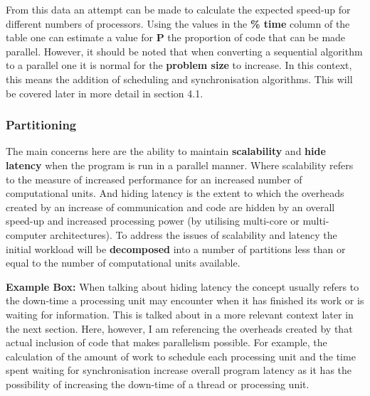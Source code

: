 \documentclass[11pt]{article} %
\begin{document}
From this data an attempt can be made to calculate the expected speed-up for different numbers of processors. Using the values in the {\bf \% time} column of the table one can estimate a value for {\bf P} the proportion of code that can be made parallel. However, it should be noted that when converting a sequential algorithm to a parallel one it is normal for the {\bf problem size} to increase. In this context, this means the addition of scheduling and synchronisation algorithms. This will be covered later in more detail in section 4.1.
\subsubsection*{Partitioning}
The main concerns here are the ability to maintain {\bf scalability} and {\bf hide latency} when the program is run in a parallel manner. Where scalability refers to the measure of increased performance for an increased number of computational units. And hiding latency is the extent to which the overheads created by an increase of communication and code are hidden by an overall speed-up and increased processing power (by utilising multi-core or multi-computer architectures). \cite[p78,79]{ref9} To address the issues of scalability and latency the initial workload will be {\bf decomposed} into a number of partitions less than or equal to the number of computational units available.\\
\begin{mdframed}
{\bf Example Box:} When talking about hiding latency the concept usually refers to the down-time a processing unit may encounter when it has finished its work or is waiting for information. This is talked about in a more relevant context later in the next section. Here, however, I am referencing the overheads created by that actual inclusion of code that makes parallelism possible. For example, the calculation of the amount of work to schedule each processing unit and the time spent waiting for synchronisation increase overall program latency as it has the possibility of increasing the down-time of a thread or processing unit.
\end{mdframed}
\bigskip
\end{document}

